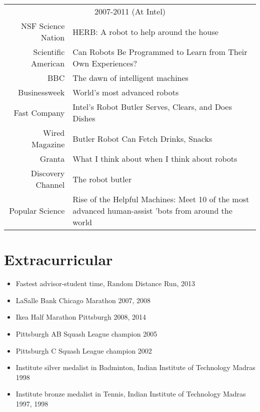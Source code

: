 \documentclass[10pt]{article}
\begin{document}
\begin{tabularx}{\linewidth}{rX}
\multicolumn{2}{c}{2007-2011 (At Intel)}\\ 
NSF Science Nation & {HERB: A robot to help around the house}\\
Scientific American & {Can Robots Be Programmed to Learn from Their Own Experiences?}\\
BBC & {The dawn of intelligent machines}\\
Businessweek & {World's most advanced robots}\\
Fast Company & {Intel's Robot Butler Serves, Clears, and Does Dishes}\\
Wired Magazine & {Butler Robot Can Fetch Drinks, Snacks}\\
Granta & {What I think about when I think about robots}\\
Discovery Channel & {The robot butler}\\
Popular Science & {Rise of the Helpful Machines: Meet 10 of the most advanced human-assist 'bots from around the world}\\
\end{tabularx}

\section{Extracurricular}
\begin{itemize}
\addtolength{\itemsep}{-0.5\baselineskip}
\item Fastest advisor-student time, Random Distance Run, 2013
\item LaSalle Bank Chicago Marathon 2007, 2008
\item Ikea Half Marathon Pittsburgh 2008, 2014
\item Pittsburgh AB Squash League champion 2005
\item Pittsburgh C Squash League champion 2002
\item Institute silver medalist in Badminton, Indian Institute of Technology Madras 1998
\item Institute bronze medalist in Tennis, Indian Institute of Technology Madras 1997, 1998
\end{itemize}
\end{document}
